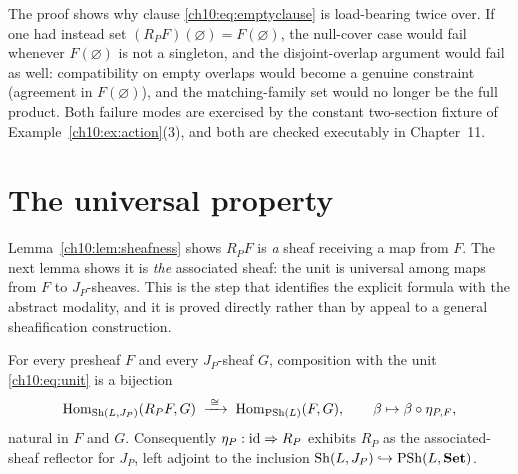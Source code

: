 \begin{remark}
\label{ch10:rem:whyempty}
The proof shows why clause \eqref{ch10:eq:emptyclause} is load-bearing twice
over. If one had instead set $(R_P F)(\varnothing) = F(\varnothing)$, the
null-cover case would fail whenever $F(\varnothing)$ is not a singleton, and
the disjoint-overlap argument would fail as well: compatibility on empty
overlaps would become a genuine constraint (agreement in $F(\varnothing)$),
and the matching-family set would no longer be the full product. Both failure
modes are exercised by the constant two-section fixture of
Example~\ref{ch10:ex:action}(3), and both are checked executably in
Chapter~11.
\end{remark}

\section{The universal property}
\label{ch10:sec:universal}

Lemma~\ref{ch10:lem:sheafness} shows $R_P F$ is \emph{a} sheaf receiving a map
from $F$. The next lemma shows it is \emph{the} associated sheaf: the unit is
universal among maps from $F$ to $J_P$-sheaves. This is the step that
identifies the explicit formula with the abstract modality, and it is proved
directly rather than by appeal to a general sheafification construction.

\begin{lemma}
\label{ch10:lem:universal}
For every presheaf $F$ and every $J_P$-sheaf $G$, composition with the unit
\eqref{ch10:eq:unit} is a bijection
\[
\mathrm{Hom}_{\mathrm{Sh}(L, J_P)}(R_P F, G) \;\xrightarrow{\;\cong\;}\; \mathrm{Hom}_{\mathrm{PSh}(L)}(F, G),
\qquad \beta \mapsto \beta \circ \eta_{P, F},
\]
natural in $F$ and $G$. Consequently $\eta_P : \mathrm{id} \Rightarrow R_P$ exhibits
$R_P$ as the associated-sheaf reflector for $J_P$, left adjoint to the
inclusion $\mathrm{Sh}(L, J_P) \hookrightarrow \mathrm{PSh}(L, \mathbf{Set})$.
\end{lemma}

